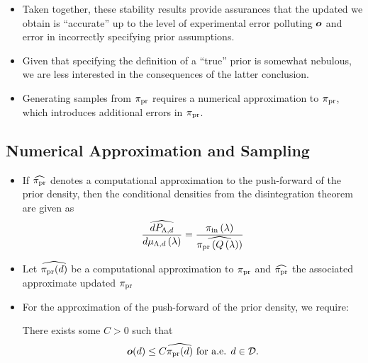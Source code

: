 \begin{frame}[t]
\begin{itemize}

	\item Taken together, these stability results provide assurances that the updated we obtain is ``accurate'' up to the level of experimental error polluting $\operatorname*{\boldsymbol{o}}$ and error in incorrectly specifying prior assumptions.
	\item Given that specifying the definition of a ``true'' prior is somewhat nebulous, we are less interested in the consequences of the latter conclusion.
	\item Generating samples from $\operatorname*{\pi_{pr}}$ requires a numerical approximation to $\operatorname*{\pi_{pr}}$, which introduces additional errors in $\operatorname*{\pi_{pr}}$.

\end{itemize}

\end{frame}


\subsection{Numerical Approximation and Sampling}
\begin{frame}[t]
\begin{itemize}
	\item If $\widehat{\operatorname*{\pi_{pr}}}$ denotes a computational approximation to the push-forward of the prior density, then the conditional densities from the disintegration theorem are given as
\[
\frac{\widehat{dP_{{\Lambda}, d}}}{d\mu_{{\Lambda}, d}\left ( \lambda \right )} = \frac{\operatorname*{\pi_{in}}\left ( \lambda \right )}{ \widehat{\operatorname*{\pi_{pr}}\left ( Q\left ( \lambda \right ) \right )} }
\]
	\item Let $\widehat{\operatorname*{\pi_{pr}}(d)}$ be a computational approximation to $\operatorname*{\pi_{pr}}$ and $\widehat{\operatorname*{\pi_{pr}}}$ the associated approximate updated $\operatorname*{\pi_{pr}}$
	\item For the approximation of the push-forward of the prior density, we require:
\begin{assumption}\label{as:predx}
There exists some $C>0$ such that
\[
\operatorname*{\boldsymbol{o}} (d) \leq C \widehat{\operatorname*{\pi_{pr}}(d)} \text{ for a.e. } d\in \mathcal{D}.
\]
\end{assumption}

\end{itemize}

\end{frame}


